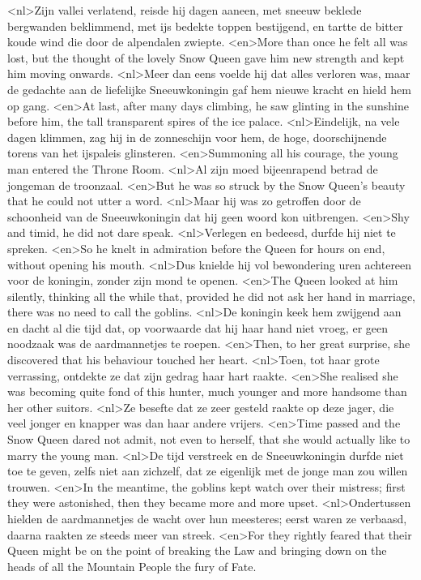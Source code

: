 <nl>Zijn vallei verlatend, reisde hij dagen aaneen, met sneeuw beklede bergwanden beklimmend, met ijs bedekte toppen bestijgend, en tartte de bitter koude wind die door de alpendalen zwiepte.
<en>More than once he felt all was lost, but the thought of the lovely Snow Queen gave him new strength and kept him moving onwards.
<nl>Meer dan eens voelde hij dat alles verloren was, maar de gedachte aan de liefelijke Sneeuwkoningin gaf hem nieuwe kracht en hield hem op gang.
<en>At last, after many days climbing, he saw glinting in the sunshine before him, the tall transparent spires of the ice palace.
<nl>Eindelijk, na vele dagen klimmen, zag hij in de zonneschijn voor hem, de hoge, doorschijnende torens van het ijspaleis  glinsteren.
<en>Summoning all his courage, the young man entered the Throne Room.
<nl>Al zijn moed bijeenrapend betrad de jongeman de troonzaal.
<en>But he was so struck by the Snow Queen’s beauty that he could not utter a word.
<nl>Maar hij was zo getroffen door de schoonheid van de Sneeuwkoningin dat hij geen woord kon uitbrengen.
<en>Shy and timid, he did not dare speak.
<nl>Verlegen en bedeesd, durfde hij niet te spreken.
<en>So he knelt in admiration before the Queen for hours on end, without opening his mouth.
<nl>Dus knielde hij  vol bewondering uren achtereen voor de koningin, zonder zijn mond te openen.
<en>The Queen looked at him silently, thinking all the while that, provided he did not ask her hand in marriage, there was no need to call the goblins.
<nl>De koningin keek hem zwijgend aan en dacht al die tijd dat, op voorwaarde dat hij haar hand niet vroeg, er geen noodzaak was de aardmannetjes te roepen.
<en>Then, to her great surprise, she discovered that his behaviour touched her heart.
<nl>Toen, tot haar grote verrassing,  ontdekte ze dat zijn gedrag haar hart raakte.
<en>She realised she was becoming quite fond of this hunter, much younger and more handsome than her other suitors.
<nl>Ze besefte dat ze zeer gesteld raakte op deze jager, die veel jonger en knapper was dan haar andere vrijers.
<en>Time passed and the Snow Queen dared not admit, not even to herself, that she would actually like to marry the young man.
<nl>De tijd verstreek en de Sneeuwkoningin durfde niet toe te geven, zelfs niet aan zichzelf, dat ze eigenlijk met de jonge man zou willen trouwen.
<en>In the meantime, the goblins kept watch over their mistress; first they were astonished, then they became more and more upset.
<nl>Ondertussen hielden de aardmannetjes de wacht over hun meesteres; eerst waren ze verbaasd, daarna raakten ze steeds meer van streek.
<en>For they rightly feared that their Queen might be on the point of breaking the Law and bringing down on the heads of all the Mountain People the fury of Fate.

